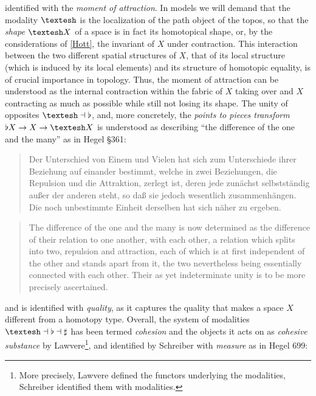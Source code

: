 \documentclass{article}
\begin{document}
identified with the \emph{moment of attraction}. In models we will demand that the modality $\textrm{\textesh}$
is the localization of the path object of the topos, so that the \emph{shape} $\textrm{\textesh} X$ of
a space is in fact its homotopical shape, or, by the considerations of \ref{Hott}, the invariant of $X$
under contraction. This interaction between the two different spatial structures of $X$, that of its local
structure (which is induced by its local elements) and its structure of homotopic equality, is of crucial
importance in topology. Thus, the moment of attraction can be understood as the internal contraction within
the fabric of $X$ taking over and $X$ contracting as much as possible while still not losing its shape.
The unity of opposites $\textrm{\textesh}\dashv\flat$, and, more concretely, the \emph{points to pieces
transform} $\flat X\rightarrow X\rightarrow \textrm{\textesh} X$ is understood as describing ``the difference
of the one and the many'' as in Hegel §361:

\begin{quote}
    Der Unterschied von Einem und Vielen hat sich zum Unterschiede ihrer Beziehung auf einander bestimmt,
welche in zwei Beziehungen, die Repulsion und die Attraktion, zerlegt ist, deren jede zunächst selbstständig
außer der anderen steht, so daß sie jedoch wesentlich zusammenhängen. Die noch unbestimmte Einheit derselben
hat sich näher zu ergeben.
\end{quote}
    
\begin{quote}
    The difference of the one and the many is now determined as the difference of their relation to one
another, with each other, a relation which splits into two, repulsion and attraction, each of which is
at first independent of the other and stands apart from it, the two nevertheless being essentially connected
with each other. Their as yet indeterminate unity is to be more precisely ascertained.
\end{quote}

and is identified with \emph{quality}, as it captures the quality that makes a space $X$ different from
a homotopy type. Overall, the system of modalities $\textrm{\textesh}\dashv\flat\dashv\sharp$ has been
termed \emph{cohesion} and the objects it acts on as \emph{cohesive substance} by Lawvere\cite{Coh}\footnote{More
precisely, Lawvere defined the functors underlying the modalities, Schreiber identified them with modalities.},
and identified by Schreiber with \emph{measure} as in Hegel 699:
\end{document}
